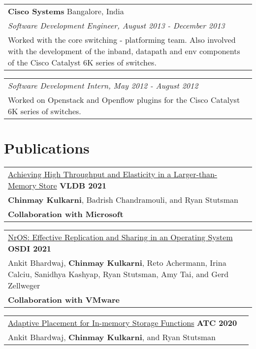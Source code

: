 \documentclass[margin,line]{res}
\begin{document}
\begin{resume}
\vspace{-7pt}
\begin{tabular}{@{}p{5.5in}p{4in}}
{\bf Cisco Systems} \dotfill Bangalore, India \\
{\small\em Software Development Engineer, August 2013 - December 2013}\\
{\small Worked with the core switching - platforming team. Also involved with the
development of the inband, datapath and env components of the
Cisco Catalyst 6K series of switches.}
\end{tabular}

\vspace{-7pt}
\begin{tabular}{@{}p{5.5in}p{4in}}
{\small\em Software Development Intern, May 2012 - August 2012}\\
{\small Worked on Openstack and Openflow plugins for the
Cisco Catalyst 6K series of switches.}
\end{tabular}

\section{\sc Publications}
 \begin{tabular}{@{}p{5.5in}p{4in}}
 \href{https://microsoft.github.io/FASTER/}{Achieving High Throughput and
 Elasticity in a Larger-than-Memory Store} \hfill
 {\small\bf VLDB 2021}\\
 {\small {\bf Chinmay Kulkarni}, Badrish Chandramouli, and Ryan
 Stutsman}\\
 {\small\bf Collaboration with Microsoft}\\
 \end{tabular}

 \vspace{-7pt}
 \begin{tabular}{@{}p{5.5in}p{4in}}
 \href{https://research.vmware.com/projects/bespin}{NrOS: Effective
 Replication and Sharing in an Operating System} \hfill
 {\small\bf OSDI 2021}\\
 {\small Ankit Bhardwaj, {\bf Chinmay Kulkarni}, Reto Achermann, Irina
  Calciu, Sanidhya Kashyap, Ryan Stutsman, Amy Tai, and Gerd Zellweger}\\
 {\small\bf Collaboration with VMware}\\
 \end{tabular}

 \vspace{-7pt}
 \begin{tabular}{@{}p{5.5in}p{4in}}
 \href{http://utah.systems/projects/kulkarni\_splinter}{Adaptive
 Placement for In-memory Storage Functions} \hfill
 {\small\bf ATC 2020}\\
 {\small Ankit Bhardwaj, {\bf Chinmay Kulkarni}, and Ryan Stutsman}\\
 \end{tabular}


\end{resume}
\end{document}
